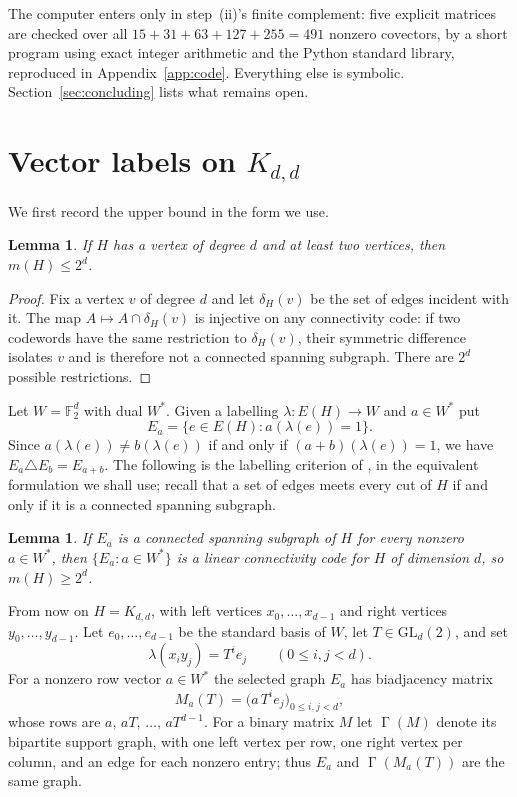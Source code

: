 \documentclass[11pt,reqno]{amsart}
\theoremstyle{plain}
\newtheorem{lemma}[theorem]{Lemma}
\theoremstyle{definition}
\newcommand{\FF}{\mathbb{F}}
\newcommand{\GL}{\mathrm{GL}}
\DeclareMathOperator{\Gam}{\Gamma}
\begin{document}
The computer enters only in step~(ii)'s finite complement: five explicit matrices are checked over all $15+31+63+127+255=491$ nonzero covectors, by a short program using exact integer arithmetic and the Python standard library, reproduced in Appendix~\ref{app:code}. Everything else is symbolic. Section~\ref{sec:concluding} lists what remains open.

\section{Vector labels on \texorpdfstring{$K_{d,d}$}{K(d,d)}}\label{sec:labels}

We first record the upper bound in the form we use.

\begin{lemma}\label{lem:upper}
If $H$ has a vertex of degree $d$ and at least two vertices, then $m(H)\le 2^{d}$.
\end{lemma}

\begin{proof}
Fix a vertex $v$ of degree $d$ and let $\delta_{H}(v)$ be the set of edges incident with it. The map $A\mapsto A\cap\delta_{H}(v)$ is injective on any connectivity code: if two codewords have the same restriction to $\delta_{H}(v)$, their symmetric difference isolates $v$ and is therefore not a connected spanning subgraph. There are $2^{d}$ possible restrictions.
\end{proof}

Let $W=\FF_{2}^{d}$ with dual $W^{*}$. Given a labelling $\lambda\colon E(H)\to W$ and $a\in W^{*}$ put
\[
E_{a}=\{e\in E(H): a(\lambda(e))=1\}.
\]
Since $a(\lambda(e))\ne b(\lambda(e))$ if and only if $(a+b)(\lambda(e))=1$, we have $E_{a}\triangle E_{b}=E_{a+b}$. The following is the labelling criterion of \cite[Lemma 2.1]{AlonConn}, in the equivalent formulation we shall use; recall that a set of edges meets every cut of $H$ if and only if it is a connected spanning subgraph.

\begin{lemma}\label{lem:criterion}
If $E_{a}$ is a connected spanning subgraph of $H$ for every nonzero $a\in W^{*}$, then $\{E_{a}: a\in W^{*}\}$ is a linear connectivity code for $H$ of dimension $d$, so $m(H)\ge 2^{d}$.
\end{lemma}

From now on $H=K_{d,d}$, with left vertices $x_{0},\dots,x_{d-1}$ and right vertices $y_{0},\dots,y_{d-1}$. Let $e_{0},\dots,e_{d-1}$ be the standard basis of $W$, let $T\in\GL_{d}(2)$, and set
\begin{equation}\label{eq:label}
\lambda(x_{i}y_{j})=T^{i}e_{j}\qquad (0\le i,j<d).
\end{equation}
For a nonzero row vector $a\in W^{*}$ the selected graph $E_{a}$ has biadjacency matrix
\begin{equation}\label{eq:biadj}
M_{a}(T)=\bigl(a\,T^{i}e_{j}\bigr)_{0\le i,j<d},
\end{equation}
whose rows are $a,\,aT,\,\dots,\,aT^{d-1}$. For a binary matrix $M$ let $\Gam(M)$ denote its bipartite support graph, with one left vertex per row, one right vertex per column, and an edge for each nonzero entry; thus $E_{a}$ and $\Gam(M_{a}(T))$ are the same graph.
\end{document}
